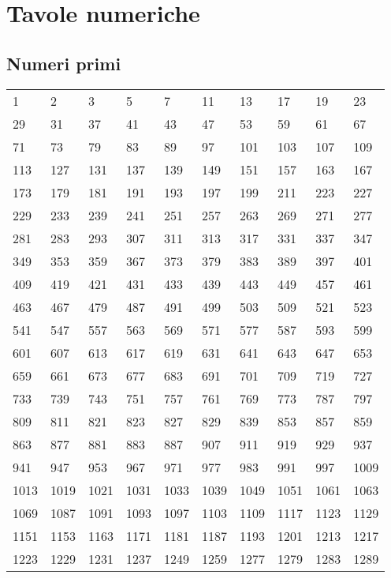 \chapter{Tavole numeriche}
\section{Numeri primi}

\begin{longtable}{llllllllll} 
	\toprule
1	&	2	&	3	&	5	&	7	&	11	&	13	&	17	&	19	&	23	\\
29	&	31	&	37	&	41	&	43	&	47	&	53	&	59	&	61	&	67	\\
71	&	73	&	79	&	83	&	89	&	97	&	101	&	103	&	107	&	109	\\
113	&	127	&	131	&	137	&	139	&	149	&	151	&	157	&	163	&	167	\\
173	&	179	&	181	&	191	&	193	&	197	&	199	&	211	&	223	&	227	\\
229	&	233	&	239	&	241	&	251	&	257	&	263	&	269	&	271	&	277	\\
281	&	283	&	293	&	307	&	311	&	313	&	317	&	331	&	337	&	347	\\
349	&	353	&	359	&	367	&	373	&	379	&	383	&	389	&	397	&	401	\\
409	&	419	&	421	&	431	&	433	&	439	&	443	&	449	&	457	&	461	\\
463	&	467	&	479	&	487	&	491	&	499	&	503	&	509	&	521	&	523	\\
541	&	547	&	557	&	563	&	569	&	571	&	577	&	587	&	593	&	599	\\
601	&	607	&	613	&	617	&	619	&	631	&	641	&	643	&	647	&	653	\\
659	&	661	&	673	&	677	&	683	&	691	&	701	&	709	&	719	&	727	\\
733	&	739	&	743	&	751	&	757	&	761	&	769	&	773	&	787	&	797	\\
809	&	811	&	821	&	823	&	827	&	829	&	839	&	853	&	857	&	859	\\
863	&	877	&	881	&	883	&	887	&	907	&	911	&	919	&	929	&	937	\\
941	&	947	&	953	&	967	&	971	&	977	&	983	&	991	&	997	&	1009	\\
1013	&	1019	&	1021	&	1031	&	1033	&	1039	&	1049	&	1051	&	1061	&	1063	\\
1069	&	1087	&	1091	&	1093	&	1097	&	1103	&	1109	&	1117	&	1123	&	1129	\\
1151	&	1153	&	1163	&	1171	&	1181	&	1187	&	1193	&	1201	&	1213	&	1217	\\
1223	&	1229	&	1231	&	1237	&	1249	&	1259	&	1277	&	1279	&	1283	&	1289	\\

\end{longtable}
